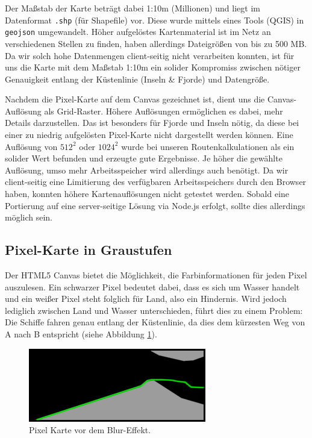 \documentclass[letterpaper]{article}
\begin{document}
	Der Maßstab der Karte beträgt dabei 1:10m (Millionen) und liegt im Datenformat \texttt{.shp} (für Shapefile) vor. Diese wurde mittels eines Tools (QGIS) in \texttt{geojson} umgewandelt. Höher aufgelöstes Kartenmaterial ist im Netz an verschiedenen Stellen zu finden\footnotemark, haben allerdings Dateigrößen von bis zu 500 MB. Da wir solch hohe Datenmengen client-seitig nicht verarbeiten konnten, ist für uns die Karte mit dem Maßstab 1:10m ein solider Kompromiss zwischen nötiger Genauigkeit entlang der Küstenlinie (Inseln \& Fjorde) und Datengröße.


	Nachdem die Pixel-Karte auf dem Canvas gezeichnet ist, dient uns die Canvas-Auflösung als Grid-Raster. Höhere Auflösungen ermöglichen es dabei, mehr Details darzustellen. Das ist besonders für Fjorde und Inseln nötig, da diese bei einer zu niedrig aufgelösten Pixel-Karte nicht dargestellt werden können. Eine Auflösung von $512^2$ oder $1024^2$ wurde bei unseren Routenkalkulationen als ein solider Wert befunden und erzeugte gute Ergebnisse. Je höher die gewählte Auflösung, umso mehr Arbeitsspeicher wird allerdings auch benötigt. Da wir client-seitig eine Limitierung des verfügbaren Arbeitsspeichers durch den Browser haben, konnten höhere Kartenauflösungen nicht getestet werden. Sobald eine Portierung auf eine server-seitige Lösung via Node.js erfolgt, sollte dies allerdings möglich sein.

	\subsection{Pixel-Karte in Graustufen}
		Der HTML5 Canvas bietet die Möglichkeit, die Farbinformationen für jeden Pixel auszulesen. Ein schwarzer Pixel bedeutet dabei, dass es sich um Wasser handelt und ein weißer Pixel steht folglich für Land, also ein Hindernis. Wird jedoch lediglich zwischen Land und Wasser unterschieden, führt dies zu einem Problem: Die Schiffe fahren genau entlang der Küstenlinie, da dies dem kürzesten Weg von A nach B entspricht (siehe Abbildung \ref{fig:route before blur}).

		\begin{figure}[!htbp]
			\centering
			\includegraphics[width=.7\linewidth]{route_before_blur}
			\caption[]{Pixel Karte vor dem Blur-Effekt.\footnotemark}
			\label{fig:route before blur}
		\end{figure}
\end{document}
